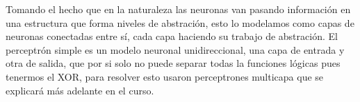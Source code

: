 Tomando el hecho que en la naturaleza las neuronas van pasando información en una estructura que forma niveles de abstración, esto lo modelamos como capas de neuronas conectadas entre sí, cada capa haciendo su trabajo de abstración.
El perceptrón simple es un modelo neuronal unidireccional, una capa de entrada y otra de salida, que por si solo no puede separar todas la funciones lógicas pues tenermos el XOR, para resolver esto usaron perceptrones multicapa que se explicará más adelante en el curso.  

